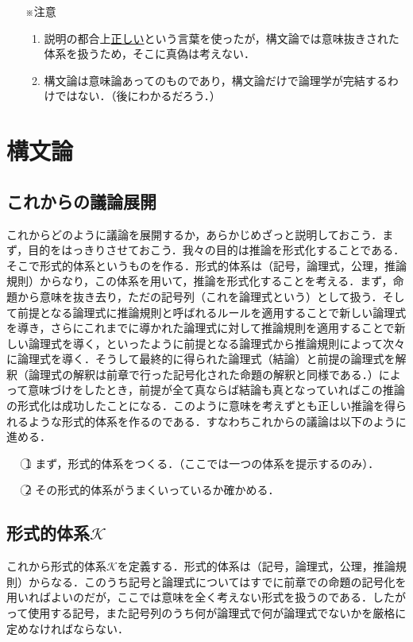 \documentclass[10pt,b5paper,papersize,dvipdfmx]{jsbook}
\begin{document}
\begin{itemize}
\item[※注意]
\begin{enumerate}
\item 説明の都合上\underline{正しい}という言葉を使ったが，構文論では意味抜きされた体系を扱うため，そこに真偽は考えない．
\item 構文論は意味論あってのものであり，構文論だけで論理学が完結するわけではない．（後にわかるだろう．）
\end{enumerate}
\end{itemize}

\section{構文論}
\subsection{これからの議論展開}
これからどのように議論を展開するか，あらかじめざっと説明しておこう．まず，目的をはっきりさせておこう．我々の目的は推論を形式化することである．そこで形式的体系というものを作る．形式的体系は（記号，論理式，公理，推論規則）からなり，この体系を用いて，推論を形式化することを考える．まず，命題から意味を抜き去り，ただの記号列（これを論理式という）として扱う．そして前提となる論理式に推論規則と呼ばれるルールを適用することで新しい論理式を導き，さらにこれまでに導かれた論理式に対して推論規則を適用することで新しい論理式を導く，といったように前提となる論理式から推論規則によって次々に論理式を導く．そうして最終的に得られた論理式（結論）と前提の論理式を解釈（論理式の解釈は前章で行った記号化された命題の解釈と同様である．）によって意味づけをしたとき，前提が全て真ならば結論も真となっていればこの推論の形式化は成功したことになる．このように意味を考えずとも正しい推論を得られるような形式的体系を作るのである．すなわちこれからの議論は以下のように進める．
\begin{itemize}
\item[\textcircled{\scriptsize 1}]まず，形式的体系をつくる．（ここでは一つの体系を提示するのみ）．
\item[\textcircled{\scriptsize 2}]その形式的体系がうまくいっているか確かめる．
\end{itemize}
\subsection{形式的体系$\mathcal K$}
これから形式的体系$\mathcal K$を定義する．形式的体系は（記号，論理式，公理，推論規則）からなる．このうち記号と論理式についてはすでに前章での命題の記号化を用いればよいのだが，ここでは意味を全く考えない形式を扱うのである．したがって使用する記号，また記号列のうち何が論理式で何が論理式でないかを厳格に定めなければならない． 
\end{document}
